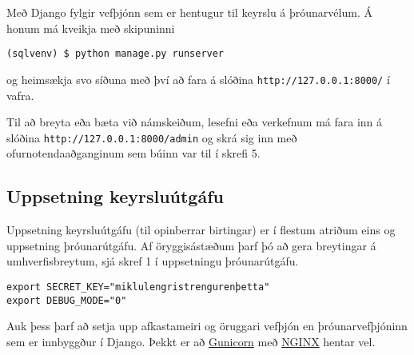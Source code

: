 Með Django fylgir vefþjónn sem er hentugur til keyrslu á þróunarvélum. Á
honum má kveikja með skipuninni

\begin{verbatim}
(sqlvenv) $ python manage.py runserver
\end{verbatim}

og heimsækja svo síðuna með því að fara á slóðina
\texttt{http://127.0.0.1:8000/} í vafra.

Til að breyta eða bæta við námskeiðum, lesefni eða verkefnum má fara inn
á slóðina \texttt{http://127.0.0.1:8000/admin} og skrá sig inn með
ofurnotendaaðganginum sem búinn var til í skrefi 5.

\subsection*{Uppsetning
keyrsluútgáfu}\label{uppsetning-keyrsluuxfatguxe1fu}

Uppsetning keyrsluútgáfu (til opinberrar birtingar) er í flestum atriðum
eins og uppsetning þróunarútgáfu. Af öryggisástæðum þarf þó að gera
breytingar á umhverfisbreytum, sjá skref 1 í uppsetningu þróunarútgáfu.

\begin{verbatim}
export SECRET_KEY="miklulengristrengurenþetta"
export DEBUG_MODE="0"
\end{verbatim}

Auk þess þarf að setja upp afkastameiri og öruggari vefþjón en þróunarvefþjóninn sem er innbyggður í Django.
Þekkt er að \href{http://gunicorn.org/}{Gunicorn} með \href{https://www.nginx.com/}{NGINX} hentar vel.